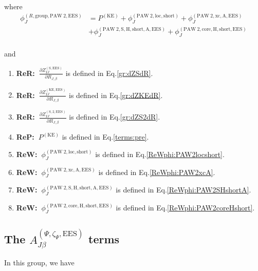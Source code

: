 \documentclass[paper=a4, fontsize=11pt]{article} %
\numberwithin{equation}{section} %
\numberwithin{figure}{section} %
\numberwithin{table}{section} %
\newcommand{\p}{\partial}
\newcommand{\rS}{{\mathrm{S}}}
\newcommand{\rKE}{{\mathrm{KE}}}
\newcommand{\rEES}{{\mathrm{EES}}}
\newcommand{\rxc}{{\mathrm{xc}}}
\newcommand{\rgr}{{\mathrm{group}}}
\newcommand{\rcore}{{\mathrm{core}}}
\newcommand{\rshort}{{\mathrm{short}}}
\newcommand{\rP}{{\mathrm{PAW}}}
\newcommand{\rH}{{\mathrm{H}}}
\newcommand{\rA}{{\mathrm{A}}}
\newcommand{\rlo}{{\mathrm{loc}}}
\newcommand{\RJb}{{R_{J,\beta}}}
\newcommand{\ReW}{{{\bf ReW:\ }}}
\newcommand{\ReP}{{{\bf ReP:\ }}}
\newcommand{\ReR}{{{\bf ReR:\ }}}
\begin{document}
where
\begin{equation}
\begin{split}
\phi_J^{(R,\rgr,\rP\ 2,\rEES)}&=P^{(\rKE)} + \phi_J^{(\rP\ 2,\rlo,\rshort)} + \phi_J^{(\rP\ 2,\rxc,\rA,\rEES)} \\
&+ \phi_J^{(\rP\ 2,\rS,\rH,\rshort,\rA,\rEES)} + \phi_J^{(\rP\ 2,\rcore,\rH,\rshort,\rEES)} \\
\end{split}
\end{equation}

and
\begin{enumerate}
\item \ReR $\frac{\p Z_{IJ}^{(\rS,\rEES)}}{\p \RJb}$ is defined in Eq.\eqref{gr:dZSdR}.
\item \ReR $\frac{\p Z_{IJ}^{(\rKE,\rEES)}}{\p \RJb}$ is defined in Eq.\eqref{gr:dZKEdR}.
\item \ReR $\frac{\p Z_{IJ}^{(\rS,2,\rEES)}}{\p \RJb}$ is defined in Eq.\eqref{gr:dZS2dR}.
\item \ReP $P^{(\rKE)}$ is defined in Eq.\eqref{terms:pre}.
\item \ReW $\phi_J^{(\rP\ 2,\rlo,\rshort)}$ is defined in Eq.\eqref{ReWphi:PAW2locshort}.
\item \ReW $\phi_J^{(\rP\ 2,\rxc,\rA,\rEES)}$ is defined in Eq.\eqref{ReWphi:PAW2xcA}.
\item \ReW $\phi_J^{(\rP\ 2,\rS,\rH,\rshort,\rA,\rEES)}$ is defined in Eq.\eqref{ReWphi:PAW2SHshortA}.
\item \ReW $\phi_J^{(\rP\ 2,\rcore,\rH,\rshort,\rEES)}$ is defined in Eq.\eqref{ReWphi:PAW2coreHshort}.
\end{enumerate}



\subsection{The $A_{J\beta}^{(\Psi,\zeta_\Psi,\rEES)}$ terms}

In this group, we have
\end{document}
